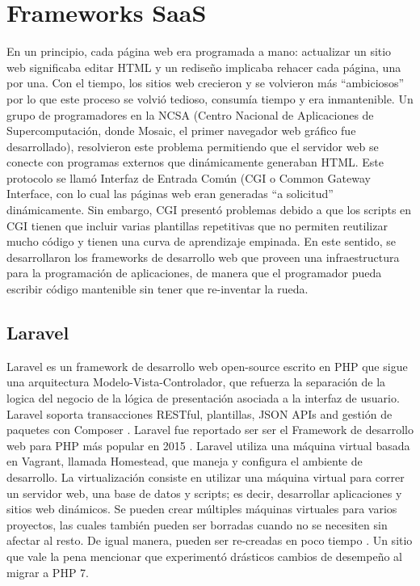 \section{Frameworks SaaS}
En un principio, cada página web era programada a mano: actualizar un sitio web significaba editar HTML y un rediseño implicaba rehacer cada página, una por una. Con el tiempo, los sitios web crecieron y se volvieron más “ambiciosos” por lo que este proceso se volvió tedioso, consumía tiempo y era inmantenible.
Un grupo de programadores en la NCSA (Centro Nacional de Aplicaciones de Supercomputación, donde Mosaic, el primer navegador web gráfico fue desarrollado), resolvieron este problema permitiendo que el servidor web se conecte con programas externos que dinámicamente generaban HTML. Este protocolo se llamó Interfaz de Entrada Común (CGI o Common Gateway Interface, con lo cual las páginas web eran generadas “a solicitud” dinámicamente. 
Sin embargo, CGI presentó problemas debido a que los scripts en CGI tienen que incluir varias plantillas repetitivas que no permiten reutilizar mucho código y tienen una curva de aprendizaje empinada.
En este sentido, se desarrollaron los frameworks de desarrollo web que proveen una infraestructura para la programación de aplicaciones, de manera que el programador pueda escribir código mantenible sin tener que re-inventar la rueda. \parencite{Holovaty2016-nm}


\subsection{Laravel}
Laravel es un framework de desarrollo web open-source escrito en PHP que sigue una arquitectura Modelo-Vista-Controlador, que refuerza la separación de la logica del negocio de la lógica de presentación asociada a la interfaz de usuario. Laravel soporta transacciones RESTful, plantillas, JSON APIs and gestión de paquetes con Composer \parencite{Bean2015-zt}.
Laravel fue reportado ser ser el Framework de desarrollo web para PHP más popular en 2015 \parencite{SitePoint2015-yl}.
Laravel utiliza una máquina virtual basada en Vagrant, llamada Homestead, que maneja y configura el ambiente de desarrollo. La virtualización consiste en utilizar una máquina virtual para correr un servidor web, una base de datos y scripts; es decir, desarrollar aplicaciones y sitios web dinámicos. Se pueden crear múltiples máquinas virtuales para varios proyectos, las cuales también pueden ser borradas cuando no se necesiten sin afectar al resto.  De igual manera, pueden ser re-creadas en poco tiempo \parencite{Wu2016-ws}. Un sitio que vale la pena mencionar que \parencite{Tumblr2016-mn} experimentó drásticos cambios de desempeño al migrar a PHP 7. 


